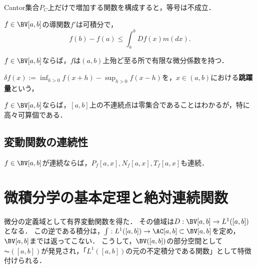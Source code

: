 \documentclass[uplatex, dvipdfmx]{jsreport}
\begin{document}
\begin{example}
    Cantor集合$P_C$上だけで増加する関数を構成すると，等号は不成立．
\end{example}

\begin{corollary}
    $f\in\BV[a,b]$の導関数$f'$は可積分で，
    \[f(b)-f(a)\le\int^b_aDf(x)m(dx).\]
\end{corollary}

\begin{theorem}[Lebesgue]
    $f\in\BV[a,b]$ならば，$f$は$(a,b)$上殆ど至る所で有限な微分係数を持つ．
\end{theorem}

\begin{definition}[saltus]
    $\delta f(x):=\inf_{h>0}f(x+h)-\sup_{h>0}f(x-h)$を，$x\in(a,b)$における\textbf{跳躍量}という，
\end{definition}

\begin{corollary}
    $f\in\BV[a,b]$ならば，$[a,b]$上の不連続点は零集合であることはわかるが，特に高々可算個である．
\end{corollary}

\subsection{変動関数の連続性}

\begin{theorem}
    $f\in\BV[a,b]$が連続ならば，$P_f[a,x],N_f[a,x],T_f[a,x]$も連続．
\end{theorem}

\section{微積分学の基本定理と絶対連続関数}

\begin{tcolorbox}[colframe=ForestGreen, colback=ForestGreen!10!white,breakable,colbacktitle=ForestGreen!40!white,coltitle=black,fonttitle=\bfseries\sffamily,
title=]
    微分の定義域として有界変動関数を得た．
    その値域は$D:\BV[a,b]\to L^1([a,b])$となる．
    この逆である積分は，$\int:L^1([a,b])\to\AC[a,b]\subset\BV[a,b]$を定め，$\BV[a,b]$までは返ってこない．
    こうして，$\BV([a,b])$の部分空間として$\AC([a,b])$が発見され，「$L^1([a,b])$の元の不定積分である関数」として特徴付けられる．

\end{tcolorbox}
\end{document}

